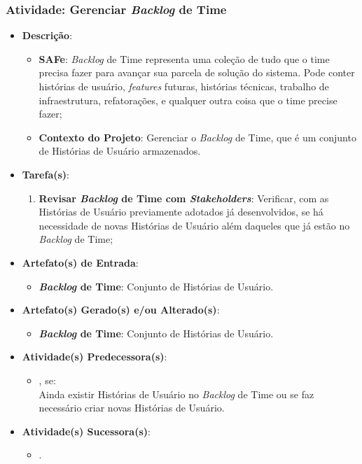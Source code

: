 			\subsubsection[Atividade: Gerenciar \emph{Backlog} de Time]{Atividade: Gerenciar \emph{Backlog} de Time}
			\label{subsubsec:processo_atividade_time_gerenciar}
				\begin{itemize}
					\item{\textbf{Descrição}:
						\begin{itemize}
							\item{\textbf{SAFe}: \emph{Backlog} de Time representa uma coleção de tudo que o time precisa fazer para avançar sua parcela de solução do sistema. Pode conter histórias de usuário, \emph{features} futuras, histórias técnicas, trabalho de infraestrutura, refatorações, e qualquer outra coisa que o time precise fazer;}
							\item{\textbf{Contexto do Projeto}: Gerenciar o \emph{Backlog} de Time, que é um conjunto de Histórias de Usuário armazenados.}
						\end{itemize}}
					\item{\textbf{Tarefa(s)}:
						\begin{enumerate}
							\item{\textbf{Revisar \emph{Backlog} de Time com \emph{Stakeholders}}: Verificar, com as Histórias de Usuário previamente adotados já desenvolvidos, se há necessidade de novas Histórias de Usuário além daqueles que já estão no \emph{Backlog} de Time;}
						\end{enumerate}}
					\item{\textbf{Artefato(s) de Entrada}:
						\begin{itemize}
							\item{\textbf{\emph{Backlog} de Time}: Conjunto de Histórias de Usuário.}
						\end{itemize}}
					\item{\textbf{Artefato(s) Gerado(s) e/ou Alterado(s)}:
						\begin{itemize}
							\item{\textbf{\emph{Backlog} de Time}: Conjunto de Histórias de Usuário.}
						\end{itemize}}
					\item{\textbf{Atividade(s) Predecessora(s)}:
						\begin{itemize}
							\item{, se:
								\\ Ainda existir Histórias de Usuário no \emph{Backlog} de Time ou se faz necessário criar novas Histórias de Usuário.}
						\end{itemize}}
					\item{\textbf{Atividade(s) Sucessora(s)}:
						\begin{itemize}
							\item{.}
						\end{itemize}}
				\end{itemize}